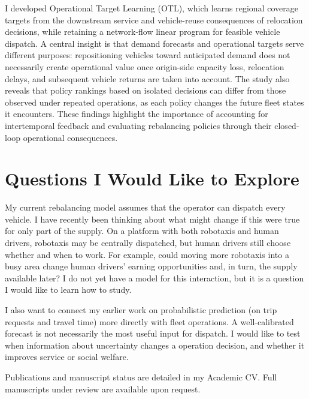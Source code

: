 \documentclass[11pt]{article}
\begin{document}
I developed Operational Target Learning (OTL), which learns regional coverage targets from the downstream service and vehicle-reuse consequences of relocation decisions, while retaining a network-flow linear program for feasible vehicle dispatch. A central insight is that demand forecasts and operational targets serve different purposes: repositioning vehicles toward anticipated demand does not necessarily create operational value once origin-side capacity loss, relocation delays, and subsequent vehicle returns are taken into account. The study also reveals that policy rankings based on isolated decisions can differ from those observed under repeated operations, as each policy changes the future fleet states it encounters. These findings highlight the importance of accounting for intertemporal feedback and evaluating rebalancing policies through their closed-loop operational consequences.


\section*{Questions I Would Like to Explore}
My current rebalancing model assumes that the operator can dispatch every vehicle. I have recently been thinking about what might change if this were true for only part of the supply. On a platform with both robotaxis and human drivers, robotaxis may be centrally dispatched, but human drivers still choose whether and when to work. For example, could moving more robotaxis into a busy area change human drivers' earning opportunities and, in turn, the supply available later? I do not yet have a model for this interaction, but it is a question I would like to learn how to study.

I also want to connect my earlier work on probabilistic prediction (on trip requests and travel time) more directly with fleet operations. A well-calibrated forecast is not necessarily the most useful input for dispatch. I would like to test when information about uncertainty changes a operation decision, and whether it improves service or social welfare.

\medskip
{\footnotesize Publications and manuscript status are detailed in my Academic CV. Full manuscripts under review are available upon request.}
\end{document}
